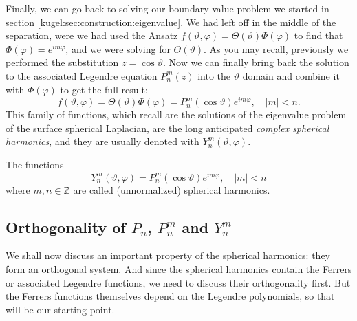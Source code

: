 Finally, we can go back to solving our boundary value problem we started in
section \ref{kugel:sec:construction:eigenvalue}. We had left off in the middle
of the separation, were we had used the Ansatz $f(\vartheta, \varphi) =
\Theta(\vartheta) \Phi(\varphi)$ to find that $\Phi(\varphi) = e^{im\varphi}$,
and we were solving for $\Theta(\vartheta)$.  As you may recall, previously we
performed the substitution $z = \cos \vartheta$. Now we can finally bring back
the solution to the associated Legendre equation $P^m_n(z)$ into the $\vartheta$
domain and combine it with $\Phi(\varphi)$ to get the full result:
\begin{equation*}
    f(\vartheta, \varphi)
      = \Theta(\vartheta)\Phi(\varphi)
      = P^m_n (\cos \vartheta) e^{im\varphi}, \quad |m|<n.
\end{equation*}
This family of functions, which recall are the solutions of the eigenvalue
problem of the surface spherical Laplacian, are the long anticipated
\emph{complex spherical harmonics}, and they are usually denoted with
$Y^m_n(\vartheta, \varphi)$.

\begin{definition}
  \label{kugel:def:spherical-harmonics}
  The functions
  \begin{equation*}
    Y^m_n (\vartheta, \varphi) = P^m_n(\cos \vartheta) e^{im\varphi}, \quad |m|<n
  \end{equation*}
  where $m, n \in \mathbb{Z}$ are called (unnormalized) spherical
  harmonics.
\end{definition}

\begin{figure}
  \centering
  \kugelplaceholderfig{\textwidth}{.8\paperheight}
  \caption{
    \label{kugel:fig:spherical-harmonics}
  }
\end{figure}


\subsection{Orthogonality of $P_n$, $P^m_n$ and $Y^m_n$}

We shall now discuss an important property of the spherical harmonics: they form
an orthogonal system. And since the spherical harmonics contain the Ferrers or
associated Legendre functions, we need to discuss their orthogonality first.
But the Ferrers functions themselves depend on the Legendre polynomials, so that
will be our starting point.

